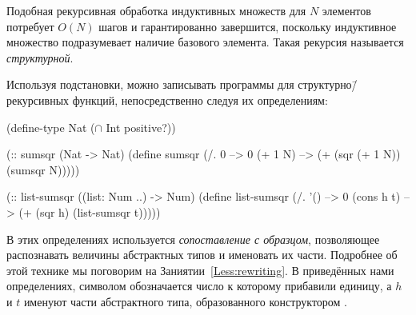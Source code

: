 Подобная рекурсивная обработка индуктивных множеств для $N$ элементов потребует $O(N)$ шагов и гарантированно завершится, поскольку индуктивное множество подразумевает наличие базового элемента. Такая рекурсия называется \emph{структурной}.

%
Используя подстановки, можно записывать программы для структурно\=/рекурсивных функций, непосредственно следуя их определениям:

\begin{SchemeCode}[emph={N}]
(define-type Nat 
  ($\cap$ Int positive?))

(:: sumsqr (Nat -> Nat)
 (define sumsqr
   (/. 0 --> 0
       (+ 1 N) --> (+ (sqr (+ 1 N)) (sumsqr N)))))
\end{SchemeCode}

\begin{SchemeCode}[emph={h,t}]
(:: list-sumsqr ((list: Num ..) -> Num)
 (define list-sumsqr
   (/. '() --> 0
       (cons h t) --> (+ (sqr h) (list-sumsqr t)))))
\end{SchemeCode}

В этих определениях используется \emph{сопоставление с образцом}, позволяющее распознавать величины абстрактных типов и именовать их части. Подробнее об этой технике мы поговорим на Заниятии~\ref{Less:rewriting}. В приведённых нами определениях, символом  обозначается число к которому прибавили единицу, а $h$ и $t$ именуют части абстрактного типа, образованного конструктором .

